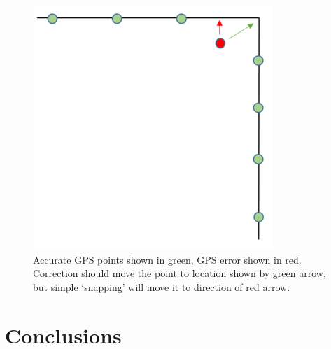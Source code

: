 \begin{figure}[H]
\centering
\includegraphics[scale=0.7]{images/gps_snapping_error.png}
\caption{Accurate GPS points shown in green, GPS error shown in red. Correction should move the point to location shown by green arrow, but simple ‘snapping’ will move it to direction of red arrow.}
\label{fig:gps_snapping_error}
\end{figure}

\section{Conclusions}
\label{sec:4conclusions}

